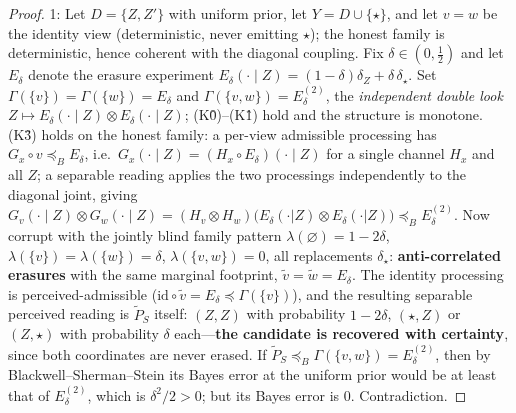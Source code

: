 \begin{proof}

1: Let \(D = \{Z, Z'\}\) with uniform prior, let \(Y = D \cup \{\star\}\), and let \(v = w\) be the identity view (deterministic, never emitting \(\star\)); the honest family is deterministic, hence coherent with the diagonal coupling. Fix \(\delta \in (0, \tfrac12)\) and let \(E_\delta\) denote the erasure experiment \(E_\delta(\cdot \mid Z) = (1-\delta)\delta_Z + \delta\,\delta_\star\). Set \(\Gamma(\{v\}) = \Gamma(\{w\}) = E_\delta\) and \(\Gamma(\{v,w\}) = E_\delta^{(2)}\), the \emph{independent double look} \(Z \mapsto E_\delta(\cdot \mid Z) \otimes E_\delta(\cdot \mid Z)\); (K0̂)--(K1̂) hold and the structure is monotone. (K3̂) holds on the honest family: a per-view admissible processing has \(G_x \circ v \preceq_B E_\delta\), i.e.~\(G_x(\cdot \mid Z) = (H_x \circ E_\delta)(\cdot \mid Z)\) for a single channel \(H_x\) and all \(Z\); a separable reading applies the two processings independently to the diagonal joint, giving \(G_v(\cdot \mid Z) \otimes G_w(\cdot \mid Z) = (H_v \otimes H_w)\big(E_\delta(\cdot|Z) \otimes E_\delta(\cdot|Z)\big) \preceq_B E_\delta^{(2)}\). Now corrupt with the jointly blind family pattern \(\lambda(\varnothing) = 1 - 2\delta\), \(\lambda(\{v\}) = \lambda(\{w\}) = \delta\), \(\lambda(\{v,w\}) = 0\), all replacements \(\delta_\star\): \textbf{anti-correlated erasures} with the same marginal footprint, \(\tilde v = \tilde w = E_\delta\). The identity processing is perceived-admissible (\(\mathrm{id} \circ \tilde v = E_\delta \preceq \Gamma(\{v\})\)), and the resulting separable perceived reading is \(\widetilde{P}_S\) itself: \((Z, Z)\) with probability \(1 - 2\delta\), \((\star, Z)\) or \((Z, \star)\) with probability \(\delta\) each---\hspace{0pt}\textbf{the candidate is recovered with certainty}, since both coordinates are never erased. If \(\widetilde{P}_S \preceq_B \Gamma(\{v,w\}) = E_\delta^{(2)}\), then by Blackwell--Sherman--Stein its Bayes error at the uniform prior would be at least that of \(E_\delta^{(2)}\), which is \(\delta^2/2 > 0\); but its Bayes error is \(0\). Contradiction.

\end{proof}
